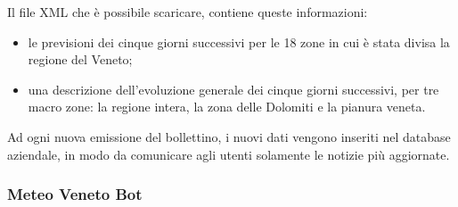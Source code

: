 Il file XML che è possibile scaricare, contiene queste informazioni:
\begin{itemize}
	\item le previsioni dei cinque giorni successivi per le 18 zone in cui è stata divisa la regione del Veneto;
	\item una descrizione dell'evoluzione generale dei cinque giorni successivi, per tre macro zone: la regione intera, la zona delle Dolomiti e la pianura veneta.
\end{itemize}

Ad ogni nuova emissione del bollettino, i nuovi dati vengono inseriti nel database aziendale, in modo da comunicare agli utenti solamente le notizie più aggiornate.

\subsubsection{Meteo Veneto Bot}

